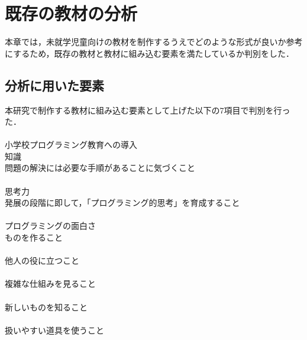 
\newpage

\section{\rm 既存の教材の分析}

本章では，未就学児童向けの教材を制作するうえでどのような形式が良いか参考にするため，既存の教材と教材に組み込む要素を満たしているか判別をした．

\subsection{\rm 分析に用いた要素}
本研究で制作する教材に組み込む要素として上げた以下の7項目で判別を行った．\\\\
小学校プログラミング教育への導入\\
知識\\
問題の解決には必要な手順があることに気づくこと\\\\
思考力\\
発展の段階に即して，「プログラミング的思考」を育成すること\\\\
プログラミングの面白さ\\
ものを作ること\\\\
他人の役に立つこと\\\\
複雑な仕組みを見ること\\\\
新しいものを知ること\\\\
扱いやすい道具を使うこと\\


